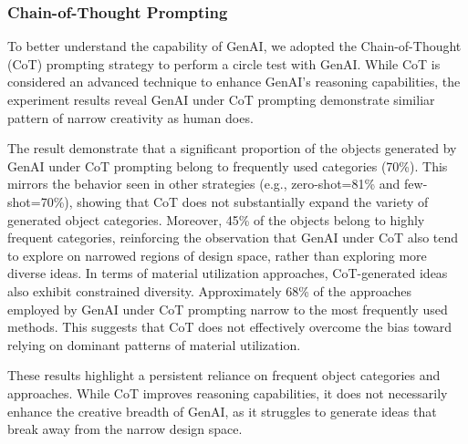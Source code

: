 \subsubsection{Chain-of-Thought Prompting}

To better understand the capability of GenAI, we adopted the Chain-of-Thought (CoT) prompting strategy to perform a circle test with GenAI. 
While CoT is considered an advanced technique to enhance GenAI's reasoning capabilities, the experiment results reveal GenAI under CoT prompting demonstrate similiar pattern of narrow creativity as human does.

The result demonstrate that a significant proportion of the objects generated by GenAI under CoT prompting belong to frequently used categories (70\%). This mirrors the behavior seen in other strategies (e.g., zero-shot=81\% and few-shot=70\%), showing that CoT does not substantially expand the variety of generated object categories.
Moreover, 45\% of the objects belong to highly frequent categories, reinforcing the observation that GenAI under CoT also tend to explore on narrowed regions of design space, rather than exploring more diverse ideas.
In terms of material utilization approaches, CoT-generated ideas also exhibit constrained diversity. Approximately 68\% of the approaches employed by GenAI under CoT prompting narrow to the most frequently used methods.
This suggests that CoT does not effectively overcome the bias toward relying on dominant patterns of material utilization.

These results highlight a persistent reliance on frequent object categories and approaches. While CoT improves reasoning capabilities, it does not necessarily enhance the creative breadth of GenAI, as it struggles to generate ideas that break away from the narrow design space.
